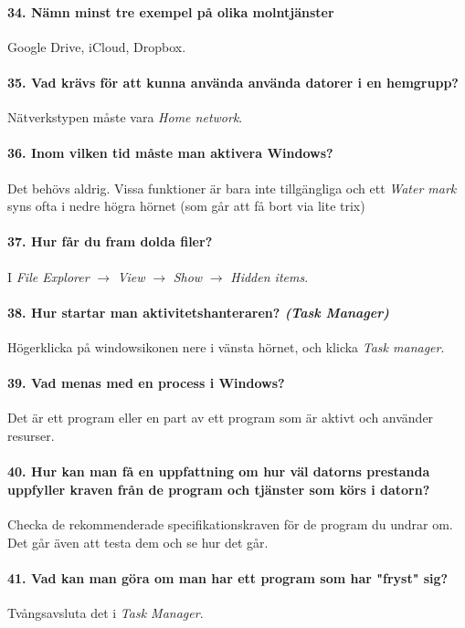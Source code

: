 \paragraph{34. Nämn minst tre exempel på olika molntjänster}
Google Drive, iCloud, Dropbox.

\paragraph{35. Vad krävs för att kunna använda använda datorer i en hemgrupp?}
Nätverkstypen måste vara \textit{Home network}.

\paragraph{36. Inom vilken tid måste man aktivera Windows?}
Det behövs aldrig. Vissa funktioner är bara inte tillgängliga och ett \textit{Water mark} syns ofta i nedre högra hörnet (som går att få bort via lite trix)

\paragraph{37. Hur får du fram dolda filer?}
I \textit{File Explorer} $\rightarrow$ \textit{View} $\rightarrow$ \textit{Show} $\rightarrow$ \textit{Hidden items}.

\paragraph{38. Hur startar man aktivitetshanteraren? \textit{(Task Manager)}}
Högerklicka på windowsikonen nere i vänsta hörnet, och klicka \textit{Task manager}.

\paragraph{39. Vad menas med en process i Windows?}
Det är ett program eller en part av ett program som är aktivt och använder resurser.

\paragraph{40. Hur kan man få en uppfattning om hur väl datorns prestanda uppfyller kraven från de program och tjänster som körs i datorn?}
Checka de rekommenderade specifikationskraven för de program du undrar om. Det går även att testa dem och se hur det går.

\paragraph{41. Vad kan man göra om man har ett program som har "fryst" sig?}
Tvångsavsluta det i \textit{Task Manager}.

